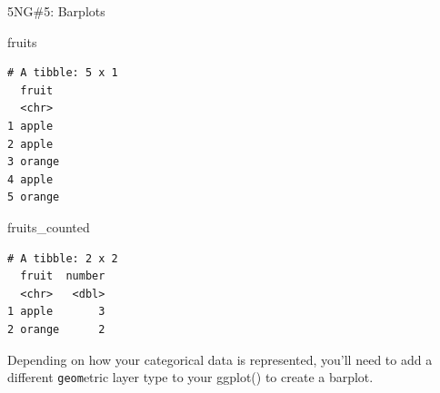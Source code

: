 \documentclass[
  ignorenonframetext,
]{beamer}
\newenvironment{Shaded}{\begin{snugshade}}{\end{snugshade}}
\newcommand{\NormalTok}[1]{#1}
\begin{document}
\begin{frame}[fragile]{5NG\#5: Barplots}
\protect\hypertarget{ng5-barplots-2}{}
\tiny

\begin{Shaded}
\begin{Highlighting}[]
\NormalTok{fruits }
\end{Highlighting}
\end{Shaded}

\begin{verbatim}
# A tibble: 5 x 1
  fruit 
  <chr> 
1 apple 
2 apple 
3 orange
4 apple 
5 orange
\end{verbatim}

\begin{Shaded}
\begin{Highlighting}[]
\NormalTok{fruits\_counted }
\end{Highlighting}
\end{Shaded}

\begin{verbatim}
# A tibble: 2 x 2
  fruit  number
  <chr>   <dbl>
1 apple       3
2 orange      2
\end{verbatim}

\normalsize

Depending on how your categorical data is represented, you'll need to
add a different \texttt{geom}etric layer type to your ggplot() to create
a barplot.
\end{frame}
\end{document}
